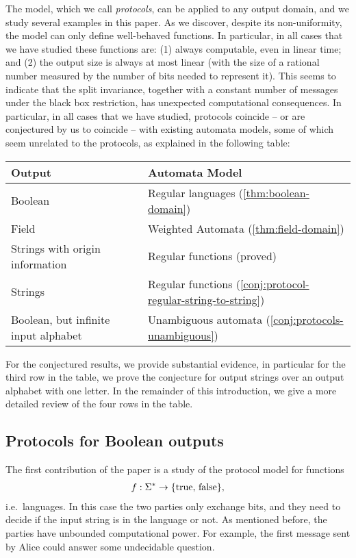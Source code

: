 The model, which we call \emph{protocols}, can be applied to any output domain,
and we study several examples in this paper. As we discover, despite its
non-uniformity, the model  can only define well-behaved functions. In
particular, in all cases that we have studied  these functions are: (1)  always
computable, even in linear time; and (2) the output size is always at most
linear (with the size of a rational number measured by the number of bits
needed to represent it).  This seems to indicate that the split invariance,
together with a  constant number of messages under the black box restriction,
has unexpected computational consequences. In particular, in all cases that we
have studied,  protocols coincide -- or are conjectured by us to coincide --
with existing automata models, some of which seem unrelated to the protocols,
as explained in the following table: 
\begin{center}
    \begin{tabular}{ll}
    \textbf{Output} & \textbf{Automata Model} \\
    \hline
    Boolean & Regular languages (\cref{thm:boolean-domain}) \\
    Field & Weighted Automata (\cref{thm:field-domain}) \\
    Strings with origin information & Regular functions (proved) \\
    Strings & Regular functions (\cref{conj:protocol-regular-string-to-string}) \\
    Boolean, but infinite input alphabet & Unambiguous  automata (\cref{conj:protocols-unambiguous}) 
\end{tabular}
\end{center}

For the conjectured results, we provide substantial evidence, in particular for
the third row in the table,  we prove the conjecture for output strings over an
output alphabet with one letter. In the remainder of this introduction, we give
a more detailed review of the four rows in the  table. 

\subsection{Protocols for Boolean outputs}
\label{sec:intro-boolean}

The first contribution of the paper is a study of the protocol model for  functions
\begin{align*}
f : \Sigma^* \to \{\text{true, false}\},
\end{align*}
i.e.~languages. In this case the two parties only exchange bits, and they need to decide if the input string is in the language or not. As mentioned before, the parties have unbounded computational power. For example, the first message sent by Alice could answer  some undecidable question.

